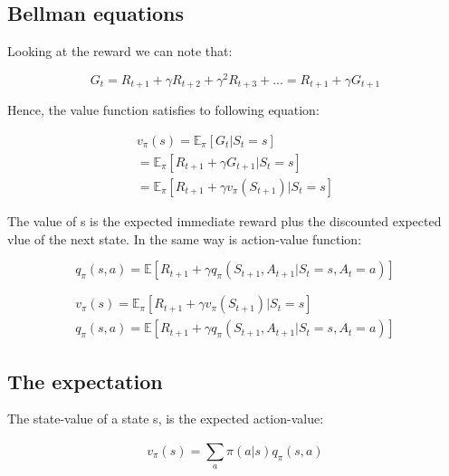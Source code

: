 \subsection*{Bellman equations}
Looking at the reward we can note that:

	\begin{equation}
		G_t = R_{t+1} + \gamma R_{t+2} + \gamma^{2} R_{t+3} + ... = R_{t+1} + \gamma G_{t+1}
	\end{equation}

Hence, the value function satisfies to following equation:

	\begin{equation}
	\begin{aligned}
		v_\pi(s) = \mathbb{E}_\pi [G_t | S_t = s]\\
		= \mathbb{E}_\pi [R_{t+1} + \gamma G_{t+1} | S_t = s] \\
		= \mathbb{E}_\pi [R_{t+1} + \gamma v_\pi(S_{t+1}) | S_t =s ]
	\end{aligned}
	\end{equation}

The value of s is the expected immediate reward plus the discounted expected vlue of the next state. In the same way is action-value function: 

	\begin{equation}
		q_\pi (s,a) = \mathbb{E} [R_{t+1} + \gamma q_\pi(S_{t+1}, A_{t+1} | S_t = s, A_t = a)]
	\end{equation}
	

\begin{wbox}{}
	\begin{equation}
	\begin{aligned}
		v_\pi(s) = \mathbb{E}_\pi [R_{t+1} + \gamma v_\pi(S_{t+1}) | S_t =s ]\\
		q_\pi (s,a) = \mathbb{E} [R_{t+1} + \gamma q_\pi(S_{t+1}, A_{t+1} | S_t = s, A_t = a)] 
	\end{aligned}
	\end{equation}
\end{wbox}

\subsection*{The expectation}
The state-value of a state s, is the expected action-value:

	\begin{equation}
		v_\pi(s)= \sum_{a}^{} \pi(a |s) q_\pi(s,a)
	\end{equation}

